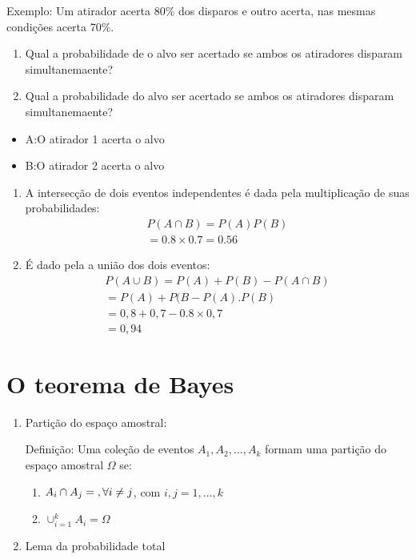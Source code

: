 \documentclass[11pt,a4paper]{book}
\begin{document}
\begin{enumerate}[label=(\alph*)]
\begin{enumerate}
Exemplo: Um atirador acerta 80\% dos disparos e outro acerta, nas mesmas condições
acerta 70\%.
\begin{enumerate}[label=(\alph*)]
  \item Qual a probabilidade de o alvo ser acertado se ambos os atiradores disparam 
    simultanemaente?
  \item Qual a probabilidade do alvo ser acertado se ambos os atiradores disparam 
    simultanemaente?
\end{enumerate}
\begin{itemize}
  \item A:\@ O atirador 1 acerta o alvo
  \item B:\@ O atirador 2 acerta o alvo
\end{itemize}
\begin{enumerate}[label=(\alph*)]
  \item  A intersecção de dois eventos independentes é dada pela multiplicação de suas probabilidades:
    \begin{align}
      P(A \cap B)= P(A)P(B)\\
      =0.8 \times 0.7= 0.56
    \end{align}
  \item É dado pela a união dos dois eventos:
    \begin{align}
      P(A \cup B)= P(A)+ P(B)- P( A \cap B )\\
      = P(A) + P(B- P(A).P(B)\\
      = 0,8+0,7 - 0.8\times 0,7\\
      =0,94
    \end{align}
\end{enumerate}
\section{O teorema de Bayes}
\begin{enumerate}[label=(\alph*)]
  \item Partição do espaço amostral: 

    Definição: Uma coleção de eventos $A_1, A_2, \ldots, A_k$ formam uma partição 
    do espaço amostral $\Omega$ se:

    \begin{enumerate}
      \item $A_i \cap A_j = \null, \forall i\neq j$, com $i,j =1,\ldots,k$
      \item $\cup_{i=1}^{k}A_i= \Omega$
    \end{enumerate}
  \item Lema da probabilidade total 


\end{enumerate}
\end{enumerate}
\end{enumerate}
\end{document}
